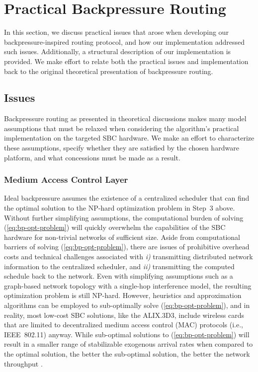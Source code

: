 \documentclass{article}
\begin{document}
\section{Practical Backpressure Routing}\label{sec:practice}

In this section, we discuss practical issues that arose when developing our backpressure-inspired routing protocol, and how our implementation addressed such issues.
Additionally, a structural description of our implementation is provided.
We make effort to relate both the practical issues and implementation back to the original theoretical presentation of backpressure routing.


\subsection{Issues}
\label{sec:practice-issues}

Backpressure routing as presented in theoretical discussions makes many model assumptions that must be relaxed when considering the algorithm's practical implementation on the targeted SBC hardware.
We make an effort to characterize these assumptions, specify whether they are satisfied by the chosen hardware platform, and what concessions must be made as a result.


\subsubsection{Medium Access Control Layer}

Ideal backpressure assumes the existence of a centralized scheduler that can find the optimal solution to the NP-hard optimization problem in Step~3 above.
Without further simplifying assumptions, the computational burden of solving (\ref{eq:bp-opt-problem}) will quickly overwhelm the capabilities of the SBC hardware for non-trivial networks of sufficient size.
Aside from computational barriers of solving (\ref{eq:bp-opt-problem}), there are issues of prohibitive overhead costs and technical challenges associated with \emph{i)} transmitting distributed network information to the centralized scheduler, and \emph{ii)} transmitting the computed schedule back to the network.
Even with simplifying assumptions such as a graph-based network topology with a single-hop interference model, the resulting optimization problem is still NP-hard.
However, heuristics and approximation algorithms can be employed to sub-optimally solve (\ref{eq:bp-opt-problem}), and in reality, most low-cost SBC solutions, like the ALIX.3D3, include wireless cards that are limited to decentralized medium access control (MAC) protocols (i.e., IEEE~802.11) anyway.
While sub-optimal solutions to (\ref{eq:bp-opt-problem}) will result in a smaller range of stabilizable exogenous arrival rates when compared to the optimal solution, the better the sub-optimal solution, the better the network throughput \cite{GeoNeeTas2006}.
\end{document}
